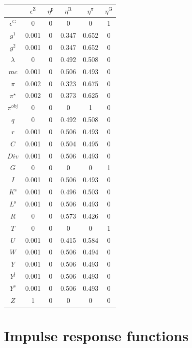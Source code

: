 \begin{tabular}{c|ccccc|}
  & $\epsilon^{\mathrm{Z}}$ & $\eta^{\mathrm{p}}$ & $\eta^{\mathrm{R}}$ & $\eta^{\pi}$ & $\eta^{\mathrm{G}}$\\
\hline
$\epsilon^{\mathrm{G}}$ & 0 & 0 & 0 & 0 & 1 \\
$g^{\mathrm{1}}$ & 0.001 & 0 & 0.347 & 0.652 & 0 \\
$g^{\mathrm{2}}$ & 0.001 & 0 & 0.347 & 0.652 & 0 \\
$\lambda$ & 0 & 0 & 0.492 & 0.508 & 0 \\
${m\!c}$ & 0.001 & 0 & 0.506 & 0.493 & 0 \\
$\pi$ & 0.002 & 0 & 0.323 & 0.675 & 0 \\
$\pi^{\star}$ & 0.002 & 0 & 0.373 & 0.625 & 0 \\
$\pi^{\mathrm{obj}}$ & 0 & 0 & 0 & 1 & 0 \\
$q$ & 0 & 0 & 0.492 & 0.508 & 0 \\
$r$ & 0.001 & 0 & 0.506 & 0.493 & 0 \\
$C$ & 0.001 & 0 & 0.504 & 0.495 & 0 \\
${D\!i\!v}$ & 0.001 & 0 & 0.506 & 0.493 & 0 \\
$G$ & 0 & 0 & 0 & 0 & 1 \\
$I$ & 0.001 & 0 & 0.506 & 0.493 & 0 \\
$K^{\mathrm{s}}$ & 0.001 & 0 & 0.496 & 0.503 & 0 \\
$L^{\mathrm{s}}$ & 0.001 & 0 & 0.506 & 0.493 & 0 \\
$R$ & 0 & 0 & 0.573 & 0.426 & 0 \\
$T$ & 0 & 0 & 0 & 0 & 1 \\
$U$ & 0.001 & 0 & 0.415 & 0.584 & 0 \\
$W$ & 0.001 & 0 & 0.506 & 0.494 & 0 \\
$Y$ & 0.001 & 0 & 0.506 & 0.493 & 0 \\
$Y^{\mathrm{j}}$ & 0.001 & 0 & 0.506 & 0.493 & 0 \\
$Y^{\mathrm{s}}$ & 0.001 & 0 & 0.506 & 0.493 & 0 \\
$Z$ & 1 & 0 & 0 & 0 & 0 \\
\hline
\end{tabular}



\pagebreak

\section{Impulse response functions}


